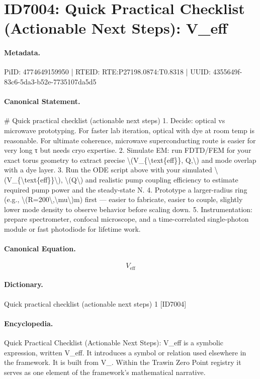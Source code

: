 \section*{ID7004: Quick Practical Checklist (Actionable Next Steps): V\_eff}
\paragraph{Metadata.}
PiID: 4774649159950 | RTEID: RTE:P27198.0874:T0.8318 | UUID: 4355649f-83c6-5da3-b52e-7735107da5d5

\paragraph{Canonical Statement.}
\# Quick practical checklist (actionable next steps) 1. Decide: optical vs microwave prototyping. For faster lab iteration, optical with dye at room temp is reasonable. For ultimate coherence, microwave superconducting route is easier for very long τ but needs cryo expertise. 2. Simulate EM: run FDTD/FEM for your exact torus geometry to extract precise \textbackslash{}(V\_\{\textbackslash{}text\{eff\}\}, Q,\textbackslash{}) and mode overlap with a dye layer. 3. Run the ODE script above with your simulated \textbackslash{}(V\_\{\textbackslash{}text\{eff\}\}\textbackslash{}), \textbackslash{}(Q\textbackslash{}) and realistic pump coupling efficiency to estimate required pump power and the steady-state N. 4. Prototype a larger-radius ring (e.g., \textbackslash{}(R=200\textbackslash{},\textbackslash{}mu\textbackslash{})m) first — easier to fabricate, easier to couple, slightly lower mode density to observe behavior before scaling down. 5. Instrumentation: prepare spectrometer, confocal microscope, and a time-correlated single-photon module or fast photodiode for lifetime work.

\paragraph{Canonical Equation.}
\[
V_{\text{eff}}
\]

\paragraph{Dictionary.}
Quick practical checklist (actionable next steps) 1 [ID7004]

\paragraph{Encyclopedia.}
Quick Practical Checklist (Actionable Next Steps): V\_eff is a symbolic expression, written V\_eff. It introduces a symbol or relation used elsewhere in the framework. It is built from V\_. Within the Trawin Zero Point registry it serves as one element of the framework's mathematical narrative.
